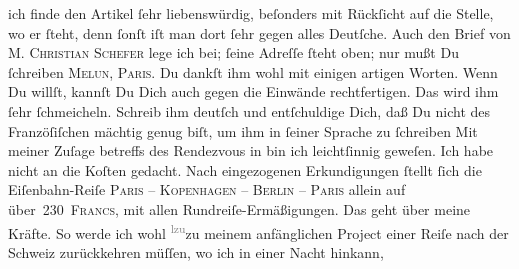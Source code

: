 \begin{ledgroupsized}[t]{13cm}
               ich finde den Artikel ſehr
               liebenswürdig, beſonders mit Rückſicht auf die Stelle, wo er  ſteht,
               denn ſonſt iſt man dort ſehr gegen alles Deutſche. Auch den Brief von \textsc{M. Christian Schefer} lege ich bei; ſeine Adreſſe ſteht oben; nur mußt Du ſchreiben \textsc{Melun, \label{K_L02777-2v}\label{K_L02777-2h}
                     Paris}. Du dankſt ihm wohl mit einigen artigen Worten. {\pb}Wenn Du willſt, kannſt Du Dich auch gegen die
               Einwände rechtfertigen. Das wird ihm ſehr ſchmeicheln. Schreib ihm deutſch und
               entſchuldige Dich, daß Du nicht des Franzöſiſchen mächtig genug biſt, um ihm in
               ſeiner Sprache zu ſchreiben{\dotsfive}\pend
           \pstart
           Mit meiner Zuſage betreffs des Rendezvous in \label{K_L02777-4v}\label{K_L02777-4h} bin ich leichtſinnig geweſen. Ich habe nicht an die Koſten gedacht. Nach
               eingezogenen Erkundigungen ſtellt ſich die Eiſenbahn-Reiſe \textsc{Paris – Kopenhagen – Berlin – Paris} allein {\pb}auf über 230 \textsc{Francs}, mit allen Rundreiſe-Ermäßigungen. Das geht über meine Kräfte. So
               werde ich wohl \substVorne{}\textsuperscript{\textcolor{gray}{lzu}}\substDazwischen{}zu\substHinten{} meinem anfänglichen Project einer Reiſe nach der Schweiz zurückkehren müſſen, wo ich in einer Nacht hinkann,

\end{ledgroupsized}
